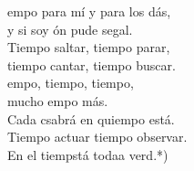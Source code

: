 \begin{cancion}
	\begin{chorus}%
	empo para mí y para los dás,\\
	y si soy ón pude segal.\\
	Tiempo  saltar, tiempo  parar,\\
	tiempo cantar, tiempo  buscar.\\
\jump
	empo, tiempo, tiempo,\\
	mucho empo más.\\
	Cada csabrá en quiempo está.\\
	Tiempo  actuar tiempo  observar.\\
	En el tiempstá todaa verd.*)\\
	\end{chorus}%
	\jump\\
\end{cancion}%

